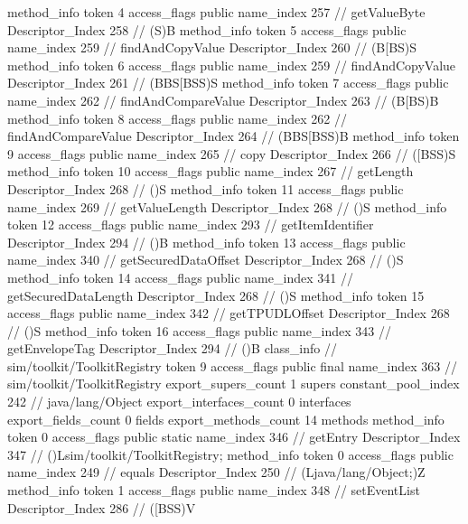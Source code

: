 {{{{{				}
				method_info {
					token	4
					access_flags	public
					name_index	257		// getValueByte
					Descriptor_Index	258		// (S)B
				}
				method_info {
					token	5
					access_flags	public
					name_index	259		// findAndCopyValue
					Descriptor_Index	260		// (B[BS)S
				}
				method_info {
					token	6
					access_flags	public
					name_index	259		// findAndCopyValue
					Descriptor_Index	261		// (BBS[BSS)S
				}
				method_info {
					token	7
					access_flags	public
					name_index	262		// findAndCompareValue
					Descriptor_Index	263		// (B[BS)B
				}
				method_info {
					token	8
					access_flags	public
					name_index	262		// findAndCompareValue
					Descriptor_Index	264		// (BBS[BSS)B
				}
				method_info {
					token	9
					access_flags	public
					name_index	265		// copy
					Descriptor_Index	266		// ([BSS)S
				}
				method_info {
					token	10
					access_flags	public
					name_index	267		// getLength
					Descriptor_Index	268		// ()S
				}
				method_info {
					token	11
					access_flags	public
					name_index	269		// getValueLength
					Descriptor_Index	268		// ()S
				}
				method_info {
					token	12
					access_flags	public
					name_index	293		// getItemIdentifier
					Descriptor_Index	294		// ()B
				}
				method_info {
					token	13
					access_flags	public
					name_index	340		// getSecuredDataOffset
					Descriptor_Index	268		// ()S
				}
				method_info {
					token	14
					access_flags	public
					name_index	341		// getSecuredDataLength
					Descriptor_Index	268		// ()S
				}
				method_info {
					token	15
					access_flags	public
					name_index	342		// getTPUDLOffset
					Descriptor_Index	268		// ()S
				}
				method_info {
					token	16
					access_flags	public
					name_index	343		// getEnvelopeTag
					Descriptor_Index	294		// ()B
				}
			}
		}
		class_info {		// sim/toolkit/ToolkitRegistry
			token	9
			access_flags	public final
			name_index	363		// sim/toolkit/ToolkitRegistry
			export_supers_count	1
			supers {
				constant_pool_index	242		// java/lang/Object
			}
			export_interfaces_count	0
			interfaces {
			}
			export_fields_count	0
			fields {
			}
			export_methods_count	14
			methods {
				method_info {
					token	0
					access_flags	public static
					name_index	346		// getEntry
					Descriptor_Index	347		// ()Lsim/toolkit/ToolkitRegistry;
				}
				method_info {
					token	0
					access_flags	public
					name_index	249		// equals
					Descriptor_Index	250		// (Ljava/lang/Object;)Z
				}
				method_info {
					token	1
					access_flags	public
					name_index	348		// setEventList
					Descriptor_Index	286		// ([BSS)V
}}}}}
